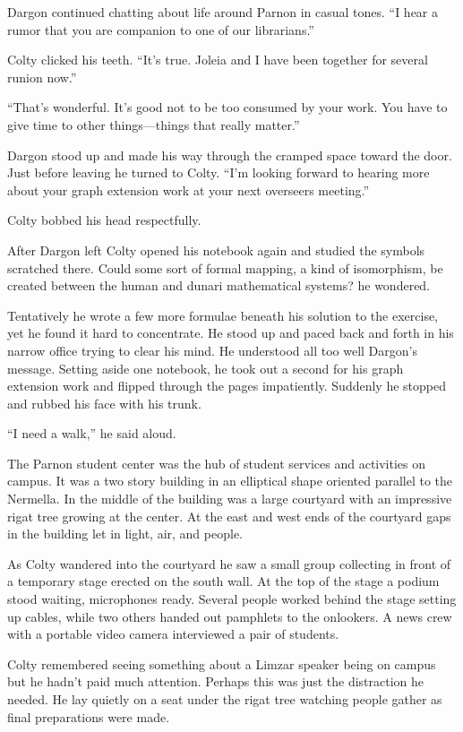Dargon continued chatting about life around Parnon in casual tones. ``I hear a rumor that you
are companion to one of our librarians.''

Colty clicked his teeth. ``It's true. Joleia and I have been together for several runion now.''

``That's wonderful. It's good not to be too consumed by your work. You have to give time to
other things---things that really matter.''

Dargon stood up and made his way through the cramped space toward the door. Just before leaving
he turned to Colty. ``I'm looking forward to hearing more about your graph extension work at
your next overseers meeting.''

Colty bobbed his head respectfully.

After Dargon left Colty opened his notebook again and studied the symbols scratched there. Could
some sort of formal mapping, a kind of isomorphism, be created between the human and dunari
mathematical systems? he wondered.

Tentatively he wrote a few more formulae beneath his solution to the exercise, yet he found it
hard to concentrate. He stood up and paced back and forth in his narrow office trying to clear
his mind. He understood all too well Dargon's message. Setting aside one notebook, he took out a
second for his graph extension work and flipped through the pages impatiently. Suddenly he
stopped and rubbed his face with his trunk.

``I need a walk,'' he said aloud.

The Parnon student center was the hub of student services and activities on campus. It was a two
story building in an elliptical shape oriented parallel to the Nermella. In the middle of the
building was a large courtyard with an impressive rigat tree growing at the center. At the east
and west ends of the courtyard gaps in the building let in light, air, and people.

As Colty wandered into the courtyard he saw a small group collecting in front of a temporary
stage erected on the south wall. At the top of the stage a podium stood waiting, microphones
ready. Several people worked behind the stage setting up cables, while two others handed out
pamphlets to the onlookers. A news crew with a portable video camera interviewed a pair of
students.

Colty remembered seeing something about a Limzar speaker being on campus but he hadn't paid much
attention. Perhaps this was just the distraction he needed. He lay quietly on a seat under the
rigat tree watching people gather as final preparations were made.

